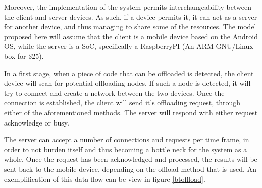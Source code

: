 Moreover, the implementation of the system permits interchangeability between the client and server devices. As such, if a device permits it, it can act as a server for another device, and thus managing to share some of the resources. The model proposed here will assume that the client is a mobile device based on the Android OS, while the server is a SoC, specifically a RaspberryPI (An ARM GNU/Linux box for \$25).

In a first stage, when a piece of code that can be offloaded is detected, the client device will scan for potential offloading nodes. If such a node is detected, it will try to connect and create a network between the two devices. Once the connection is established, the client will send it's offloading request, through either of the aforementioned methods. The server will respond with either request acknowledge or busy.

The server can accept a number of connections and requests per time frame, in order to not burden itself and thus becoming a bottle neck for the system as a whole. Once the request has been acknowledged and processed, the results will be sent back to the mobile device, depending on the offload method that is used. An exemplification of this data flow can be view in figure \ref{btoffload}.
